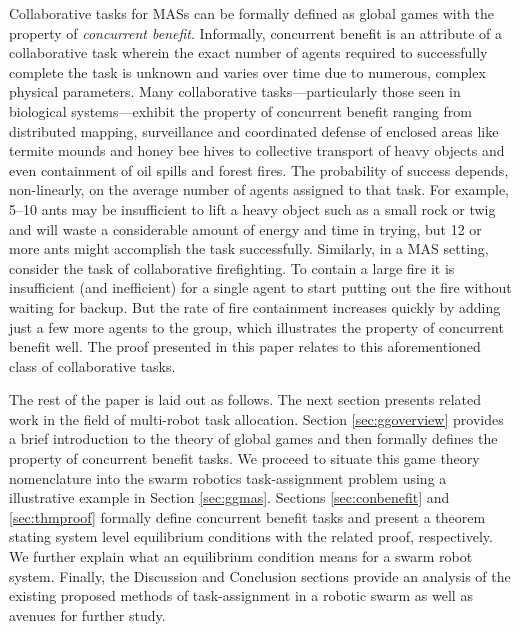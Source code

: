 \documentclass[conference]{ieeeconf}
\begin{document}
Collaborative tasks for MASs can be formally defined as global games with the property of \emph{concurrent benefit}. Informally, concurrent benefit is an attribute of a collaborative task wherein the exact number of agents required to successfully complete the task is unknown and varies over time due to numerous, complex physical parameters. Many collaborative tasks---particularly those seen in biological systems---exhibit the property of concurrent benefit ranging from distributed mapping, surveillance and coordinated defense of enclosed areas like termite mounds and honey bee hives \cite{Breed1990} to collective transport of heavy objects and even containment of oil spills and forest fires. The probability of success depends, non-linearly, on the average number of agents assigned to that task. For example, 5--10 ants may be insufficient to lift a heavy object such as a small rock or twig and will waste a considerable amount of energy and time in trying, but 12 or more ants might accomplish the task successfully. Similarly, in a MAS setting, consider the task of collaborative firefighting. To contain a large fire it is insufficient (and inefficient) for a single agent to start putting out the fire without waiting for backup. But the rate of fire containment increases quickly by adding just a few more agents to the group, which illustrates the property of concurrent benefit well. The proof presented in this paper relates to this aforementioned class of collaborative tasks.

The rest of the paper is laid out as follows. The next section presents related work in the field of multi-robot task allocation. Section \ref{sec:ggoverview} provides a brief introduction to the theory of global games and then formally defines the property of concurrent benefit tasks. We proceed to situate this game theory nomenclature into the swarm robotics task-assignment problem using a illustrative example in Section \ref{sec:ggmas}. Sections \ref{sec:conbenefit} and \ref{sec:thmproof} formally define concurrent benefit tasks and present a theorem stating system level equilibrium conditions with the related proof, respectively. We further explain what an equilibrium condition means for a swarm robot system. Finally, the Discussion and Conclusion sections provide an analysis of the existing proposed methods of task-assignment in a robotic swarm as well as avenues for further study.
\end{document}
